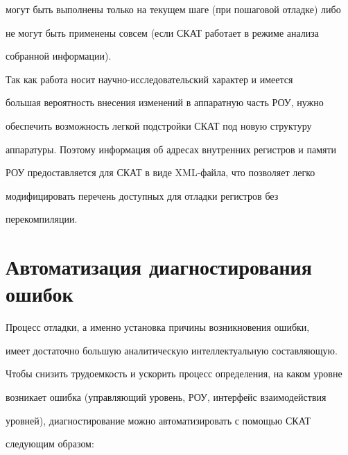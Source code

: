 могут быть выполнены только на текущем шаге (при пошаговой отладке) либо 


не могут быть применены совсем (если СКАТ работает в режиме анализа 


собранной информации).


      


      Так как работа носит научно-исследовательский характер и имеется 


большая вероятность внесения изменений в аппаратную часть РОУ, нужно 


обеспечить возможность легкой подстройки СКАТ под новую структуру 


аппаратуры. Поэтому информация об адресах внутренних регистров и памяти 


РОУ предоставляется для СКАТ в виде XML-фай\-ла, что позволяет легко 


модифицировать перечень доступных для отладки регистров без 


перекомпиляции.





\section{Автоматизация диагностирования ошибок}


      


      Процесс отладки, а именно установка причины возникновения ошибки, 


имеет достаточно большую аналитическую интеллектуальную составляющую. 


Чтобы снизить трудоемкость и ускорить процесс определения, на каком уровне 


возникает ошибка (управляющий уровень, РОУ, интерфейс взаимодействия 


уровней), диагностирование можно автоматизировать с помощью СКАТ 


следующим образом:



